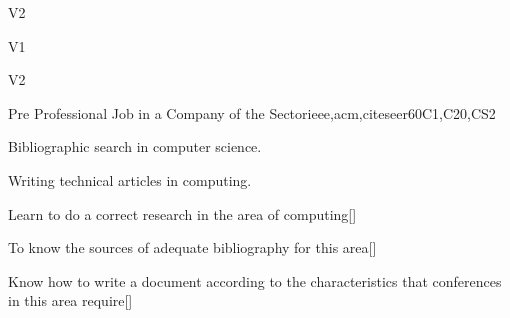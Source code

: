 \begin{syllabus}
\begin{outcomes}{V2}
  \item {}
  \item {}
  \item {}
  \item {}
\end{outcomes}

\begin{competences}{V1}
    \item {} 
    \item {}
    \item {}
\end{competences}

\begin{competences}{V2}
    \item {} 
    \item {}
    \item {}
\end{competences}

\begin{unit}{}{Pre Professional Job in a Company of the Sector}{ieee,acm,citeseer}{60}{C1,C20,CS2}
  \begin{topics}
      \item Bibliographic search in computer science.
      \item Writing technical articles in computing.
  \end{topics}
  \begin{learningoutcomes}
      \item Learn to do a correct research in the area of computing[\Usage]
      \item To know the sources of adequate bibliography for this area[\Usage]
      \item Know how to write a document according to the characteristics that conferences in this area require[\Usage]
  \end{learningoutcomes}
\end{unit}

\begin{coursebibliography}
\end{coursebibliography}

\end{syllabus}
